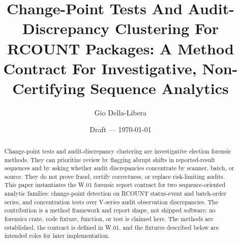 \documentclass[12pt]{article}
\title{Change-Point Tests And Audit-Discrepancy Clustering For RCOUNT Packages:
A Method Contract For Investigative, Non-Certifying Sequence Analytics}
\author{Gio Della-Libera}
\date{Draft --- \today}
\begin{document}
\maketitle

\begin{abstract}
Change-point tests and audit-discrepancy clustering are investigative election
forensic methods. They can prioritize review by flagging abrupt shifts in
reported-result sequences and by asking whether audit discrepancies concentrate
by scanner, batch, or source. They do not prove fraud, certify correctness, or
replace risk-limiting audits. This paper instantiates the W.01 forensic report
contract for two sequence-oriented analytic families: change-point detection on
RCOUNT status-event and batch-order series, and concentration tests over
V-series audit observation discrepancies. The contribution is a method
framework and report shape, not shipped software: no forensics crate, code
fixture, function, or test is claimed here. The methods are established, the
contract is defined in W.01, and the fixtures described below are intended
roles for later implementation.
\end{abstract}








\nocite{rcount-overview-2026,w01-election-forensics-2026}


\end{document}
